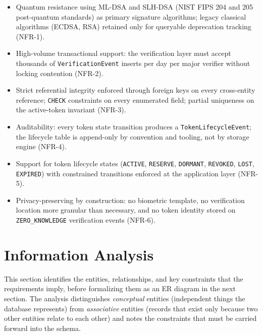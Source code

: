 \documentclass[11pt,letterpaper]{article}
\newcommand{\entity}[1]{\texttt{\color{navydark}#1}}
\begin{document}
\begin{itemize}
  \item Quantum resistance using ML-DSA and SLH-DSA (NIST FIPS 204 and 205 post-quantum standards) as primary signature algorithms; legacy classical algorithms (ECDSA, RSA) retained only for queryable deprecation tracking (NFR-1).
  \item High-volume transactional support: the verification layer must accept thousands of \entity{VerificationEvent} inserts per day per major verifier without locking contention (NFR-2).
  \item Strict referential integrity enforced through foreign keys on every cross-entity reference; \texttt{CHECK} constraints on every enumerated field; partial uniqueness on the active-token invariant (NFR-3).
  \item Auditability: every token state transition produces a \entity{TokenLifecycleEvent}; the lifecycle table is append-only by convention and tooling, not by storage engine (NFR-4).
  \item Support for token lifecycle states (\texttt{ACTIVE}, \texttt{RESERVE}, \texttt{DORMANT}, \texttt{REVOKED}, \texttt{LOST}, \texttt{EXPIRED}) with constrained transitions enforced at the application layer (NFR-5).
  \item Privacy-preserving by construction: no biometric template, no verification location more granular than necessary, and no token identity stored on \texttt{ZERO\_KNOWLEDGE} verification events (NFR-6).
\end{itemize}

\section{Information Analysis}
\label{sec:info-analysis}

This section identifies the entities, relationships, and key constraints that the requirements imply, before formalizing them as an ER diagram in the next section. The analysis distinguishes \textit{conceptual} entities (independent things the database represents) from \textit{associative} entities (records that exist only because two other entities relate to each other) and notes the constraints that must be carried forward into the schema.
\end{document}
